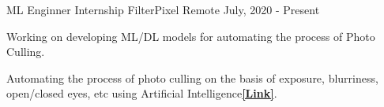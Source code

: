 

\begin{cventries}

 \cventry
    {ML Enginner Internship} %
    {FilterPixel} %
    {Remote} %
    {July, 2020 - Present} %
   {
      \begin{cvitems} %
        \item {Working on developing ML/DL models for automating the process of Photo Culling.}
        \item {Automating the process of photo culling on the basis of exposure, blurriness, open/closed eyes, etc using Artificial Intelligence{\href{https://filterpixel.com/}{\bf [Link]}}.}
      \end{cvitems}
   }

\end{cventries}